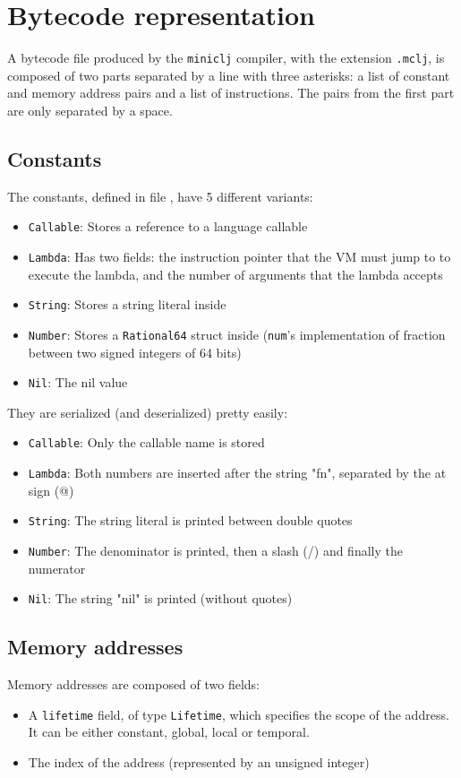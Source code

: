 \documentclass[11pt]{scrreprt}
\begin{document}
\section{Bytecode representation}
\label{comp:bytecode}
A bytecode file produced by the \texttt{miniclj} compiler, with the extension \texttt{.mclj}, is composed of two parts separated by a line with three asterisks: a list of constant and memory address pairs and a list of instructions. The pairs from the first part are only separated by a space.

\subsection{Constants}
The constants, defined in file , have 5 different variants:
\begin{itemize}
  \item \texttt{Callable}: Stores a reference to a language callable
  \item \texttt{Lambda}: Has two fields: the instruction pointer that the VM must jump to to execute the lambda, and the number of arguments that the lambda accepts
  \item \texttt{String}: Stores a string literal inside
  \item \texttt{Number}: Stores a \texttt{Rational64} struct inside (\texttt{num}'s implementation of fraction between two signed integers of 64 bits)
  \item \texttt{Nil}: The nil value
\end{itemize}

They are serialized (and deserialized) pretty easily:
\begin{itemize}
  \item \texttt{Callable}: Only the callable name is stored
  \item \texttt{Lambda}: Both numbers are inserted after the string "fn", separated by the at sign (@)
  \item \texttt{String}: The string literal is printed between double quotes
  \item \texttt{Number}: The denominator is printed, then a slash (/) and finally the numerator
  \item \texttt{Nil}: The string "nil" is printed (without quotes)
\end{itemize}

\subsection{Memory addresses}
Memory addresses are composed of two fields:
\begin{itemize}
  \item A \texttt{lifetime} field, of type \texttt{Lifetime}, which specifies the scope of the address. It can be either constant, global, local or temporal.
  \item The index of the address (represented by an unsigned integer)
\end{itemize}
\end{document}

